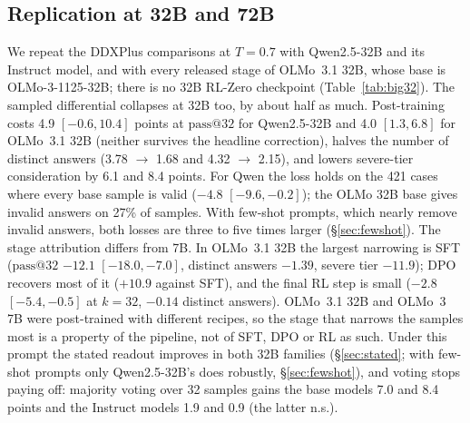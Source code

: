 \documentclass[11pt]{article}
\makeatletter
\newcommand{\passk}[1]{\mathrm{pass@}#1}
\makeatother
\begin{document}
\subsection{Replication at 32B and 72B}\label{sec:big32}
We repeat the DDXPlus comparisons at $T{=}0.7$ with Qwen2.5-32B and its Instruct model, and with every released stage of OLMo~3.1 32B, whose base is OLMo-3-1125-32B; there is no 32B RL-Zero checkpoint (Table~\ref{tab:big32}).
The sampled differential collapses at 32B too, by about half as much. Post-training costs 4.9 $[-0.6,10.4]$ points at $\passk{32}$ for Qwen2.5-32B and 4.0 $[1.3,6.8]$ for OLMo~3.1 32B (neither survives the headline correction), halves the number of distinct answers (3.78 $\rightarrow$ 1.68 and 4.32 $\rightarrow$ 2.15), and lowers severe-tier consideration by 6.1 and 8.4 points. For Qwen the loss holds on the 421 cases where every base sample is valid ($-4.8$ $[-9.6,-0.2]$); the OLMo 32B base gives invalid answers on 27\% of samples. With few-shot prompts, which nearly remove invalid answers, both losses are three to five times larger (\S\ref{sec:fewshot}).
The stage attribution differs from 7B. In OLMo~3.1 32B the largest narrowing is SFT ($\passk{32}$ $-12.1$ $[-18.0,-7.0]$, distinct answers $-1.39$, severe tier $-11.9$); DPO recovers most of it ($+10.9$ against SFT), and the final RL step is small ($-2.8$ $[-5.4,-0.5]$ at $k{=}32$, $-0.14$ distinct answers). OLMo~3.1 32B and OLMo~3 7B were post-trained with different recipes, so the stage that narrows the samples most is a property of the pipeline, not of SFT, DPO or RL as such.
Under this prompt the stated readout improves in both 32B families (\S\ref{sec:stated}; with few-shot prompts only Qwen2.5-32B's does robustly, \S\ref{sec:fewshot}), and voting stops paying off: majority voting over 32 samples gains the base models 7.0 and 8.4 points and the Instruct models 1.9 and 0.9 (the latter n.s.).
\end{document}
